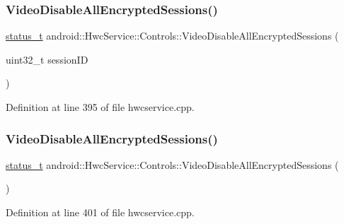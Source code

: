 \subsubsection{\texorpdfstring{Video\+Disable\+All\+Encrypted\+Sessions()}{VideoDisableAllEncryptedSessions()}\hspace{0.1cm}{\footnotesize\ttfamily [1/2]}}
{\footnotesize\ttfamily \mbox{\hyperlink{hwcserviceapi_8h_a3806fb2027d9a316d8ca8d9b8b8eb96f}{status\+\_\+t}} android\+::\+Hwc\+Service\+::\+Controls\+::\+Video\+Disable\+All\+Encrypted\+Sessions (\begin{DoxyParamCaption}\item[{uint32\+\_\+t}]{session\+ID }\end{DoxyParamCaption})}



Definition at line 395 of file hwcservice.\+cpp.


\begin{DoxyCode}{0}
\end{DoxyCode}
\mbox{\label{classandroid_1_1HwcService_1_1Controls_ae4da8d03acf7eb18dfd91b41cfc55887}} 
\subsubsection{\texorpdfstring{Video\+Disable\+All\+Encrypted\+Sessions()}{VideoDisableAllEncryptedSessions()}\hspace{0.1cm}{\footnotesize\ttfamily [2/2]}}
{\footnotesize\ttfamily \mbox{\hyperlink{hwcserviceapi_8h_a3806fb2027d9a316d8ca8d9b8b8eb96f}{status\+\_\+t}} android\+::\+Hwc\+Service\+::\+Controls\+::\+Video\+Disable\+All\+Encrypted\+Sessions (\begin{DoxyParamCaption}{ }\end{DoxyParamCaption})}



Definition at line 401 of file hwcservice.\+cpp.


